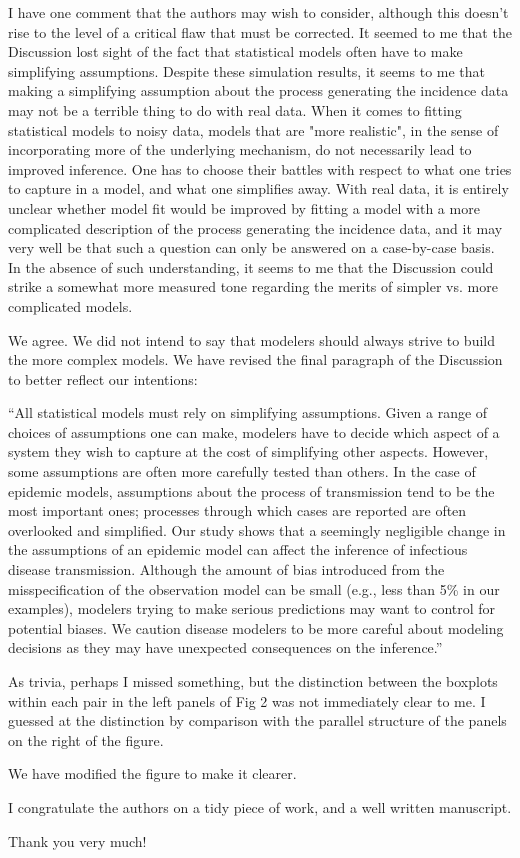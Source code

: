 \documentclass[12pt]{article}
\newcommand{\revtext}{\textsf}
\begin{document}
\revtext{I have one comment that the authors may wish to consider, although this doesn't rise to the level of a critical flaw that must be corrected.  It seemed to me that the Discussion lost sight of the fact that statistical models often have to make simplifying assumptions.  Despite these simulation results, it seems to me that making a simplifying assumption about the process generating the incidence data may not be a terrible thing to do with real data.  When it comes to fitting statistical models to noisy data, models that are "more realistic", in the sense of incorporating more of the underlying mechanism, do not necessarily lead to improved inference.  One has to choose their battles with respect to what one tries to capture in a model, and what one simplifies away.  With real data, it is entirely unclear whether model fit would be improved by fitting a model with a more complicated description of the process generating the incidence data, and it may very well be that such a
question can only be answered on a case-by-case basis.  In the absence of such understanding, it seems to me that the Discussion could strike a somewhat more measured tone regarding the merits of simpler vs. more complicated models.}

We agree. We did not intend to say that modelers should always strive to build the more complex models. We have revised the final paragraph of the Discussion to better reflect our intentions:

``All statistical models must rely on simplifying assumptions.
Given a range of choices of assumptions one can make, modelers have to
decide which aspect of a system they wish to capture 
at the cost of simplifying other aspects.
However, some assumptions are often more carefully tested than others.
In the case of epidemic models, assumptions about the process of transmission tend to be
the most important ones; processes through which cases are reported are often 
overlooked and simplified.
Our study shows that a seemingly negligible change in the assumptions of an epidemic
model can affect the inference of 
infectious disease transmission.
Although the amount of bias introduced from the misspecification of the observation
model can be small (e.g., less than 5\% in our examples), modelers
trying to make serious predictions may want to control for potential biases.
We caution disease modelers to be more careful about modeling decisions as they may have unexpected consequences on the inference.''

\revtext{As trivia, perhaps I missed something, but the distinction between the boxplots within each pair in the left panels of Fig 2 was not immediately clear to me.  I guessed at the distinction by comparison with the parallel structure of the panels on the right of the figure.}

We have modified the figure to make it clearer.

\revtext{I congratulate the authors on a tidy piece of work, and a well written manuscript.}

Thank you very much!
\end{document}
